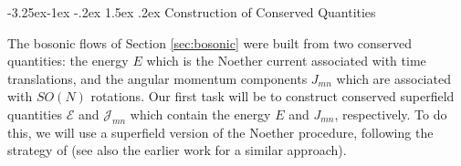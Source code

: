 \documentclass[12pt]{article}
\makeatletter
\numberwithin{equation}{section}
\renewcommand\subsection{\@startsection{subsection}{2}{\z@}%
                                     {-3.25ex\@plus -1ex \@minus -.2ex}%
                                     {1.5ex \@plus .2ex}%
                                     {\normalfont\bfseries}}
\makeatother
\begin{document}
\subsection{Construction of Conserved Quantities}

The bosonic flows of Section \ref{sec:bosonic} were built from two conserved quantities: the energy $E$ which is the Noether current associated with time translations, and the angular momentum components $J_{mn}$ which are associated with $SO(N)$ rotations. Our first task will be to construct conserved superfield quantities $\mathcal{E}$ and $\mathcal{J}_{mn}$ which contain the energy $E$ and $J_{mn}$, respectively. To do this, we will use a superfield version of the Noether procedure, following the strategy of \cite{Ebert:2022xfh} (see also the earlier work \cite{Clark:2001zv} for a similar approach).
\end{document}
